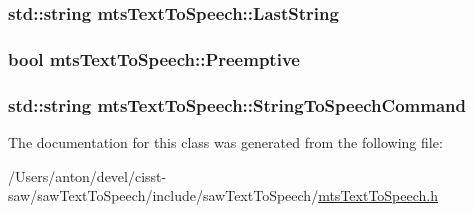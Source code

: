 \subsubsection[{Last\+String}]{\setlength{\rightskip}{0pt plus 5cm}std\+::string mts\+Text\+To\+Speech\+::\+Last\+String\hspace{0.3cm}{\ttfamily [protected]}}\label{classmts_text_to_speech_a8b6a91cf728698b9bd49ac8d888bbc48}
\hypertarget{classmts_text_to_speech_a78a3e0004193dbd080e027c3b7a97fa8}{}
\subsubsection[{Preemptive}]{\setlength{\rightskip}{0pt plus 5cm}bool mts\+Text\+To\+Speech\+::\+Preemptive\hspace{0.3cm}{\ttfamily [protected]}}\label{classmts_text_to_speech_a78a3e0004193dbd080e027c3b7a97fa8}
\hypertarget{classmts_text_to_speech_aadd1b9d1f241afe95b2f2b7fa34422a8}{}
\subsubsection[{String\+To\+Speech\+Command}]{\setlength{\rightskip}{0pt plus 5cm}std\+::string mts\+Text\+To\+Speech\+::\+String\+To\+Speech\+Command\hspace{0.3cm}{\ttfamily [protected]}}\label{classmts_text_to_speech_aadd1b9d1f241afe95b2f2b7fa34422a8}


The documentation for this class was generated from the following file\+:\begin{DoxyCompactItemize}
\item 
/\+Users/anton/devel/cisst-\/saw/saw\+Text\+To\+Speech/include/saw\+Text\+To\+Speech/\hyperlink{mts_text_to_speech_8h}{mts\+Text\+To\+Speech.\+h}\end{DoxyCompactItemize}
